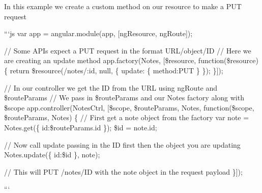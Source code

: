 In this example we create a custom method on our resource to make a P\+U\+T request
\begin{DoxyItemize}
\item ```js var app = angular.\+module(\textquotesingle{}app\textquotesingle{}, \mbox{[}\textquotesingle{}ng\+Resource\textquotesingle{}, \textquotesingle{}ng\+Route\textquotesingle{}\mbox{]});

// Some A\+P\+Is expect a P\+U\+T request in the format U\+R\+L/object/\+I\+D // Here we are creating an \textquotesingle{}update\textquotesingle{} method app.\+factory(\textquotesingle{}Notes\textquotesingle{}, \mbox{[}\textquotesingle{}\$resource\textquotesingle{}, function(\$resource) \{ return \$resource(\textquotesingle{}/notes/\+:id\textquotesingle{}, null, \{ \textquotesingle{}update\textquotesingle{}\+: \{ method\+:\textquotesingle{}P\+U\+T\textquotesingle{} \} \}); \}\mbox{]});

// In our controller we get the I\+D from the U\+R\+L using ng\+Route and \$route\+Params // We pass in \$route\+Params and our Notes factory along with \$scope app.\+controller(\textquotesingle{}Notes\+Ctrl\textquotesingle{}, \mbox{[}\textquotesingle{}\$scope\textquotesingle{}, \textquotesingle{}\$route\+Params\textquotesingle{}, \textquotesingle{}Notes\textquotesingle{}, function(\$scope, \$route\+Params, Notes) \{ // First get a note object from the factory var note = Notes.\+get(\{ id\+:\$route\+Params.\+id \}); \$id = note.\+id;

// Now call update passing in the I\+D first then the object you are updating Notes.\+update(\{ id\+:\$id \}, note);

// This will P\+U\+T /notes/\+I\+D with the note object in the request payload \}\mbox{]});
\item ```
\end{DoxyItemize}


